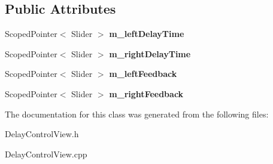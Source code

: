 \subsection*{Public Attributes}
\begin{DoxyCompactItemize}
\item 
Scoped\+Pointer$<$ Slider $>$ {\bfseries m\+\_\+left\+Delay\+Time}\hypertarget{class_delay_control_view_a4ac51c46b552b78344cc73543f7ef511}{}\label{class_delay_control_view_a4ac51c46b552b78344cc73543f7ef511}

\item 
Scoped\+Pointer$<$ Slider $>$ {\bfseries m\+\_\+right\+Delay\+Time}\hypertarget{class_delay_control_view_a39e211a86df3262610426be25fc3e5b5}{}\label{class_delay_control_view_a39e211a86df3262610426be25fc3e5b5}

\item 
Scoped\+Pointer$<$ Slider $>$ {\bfseries m\+\_\+left\+Feedback}\hypertarget{class_delay_control_view_ac0fc584a50f68dc98923d7e9d7a82648}{}\label{class_delay_control_view_ac0fc584a50f68dc98923d7e9d7a82648}

\item 
Scoped\+Pointer$<$ Slider $>$ {\bfseries m\+\_\+right\+Feedback}\hypertarget{class_delay_control_view_a1a9d17f0515be58333d974173fa62e14}{}\label{class_delay_control_view_a1a9d17f0515be58333d974173fa62e14}

\end{DoxyCompactItemize}


The documentation for this class was generated from the following files\+:\begin{DoxyCompactItemize}
\item 
Delay\+Control\+View.\+h\item 
Delay\+Control\+View.\+cpp\end{DoxyCompactItemize}
